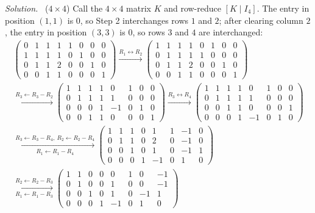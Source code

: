 \documentclass[12pt]{article}
\theoremstyle{definition}
\newenvironment{solution}{\par\noindent\textit{Solution.}\ }{\par\smallskip}
\begin{document}
\begin{solution}
(\(4\times4\)) Call the \(4\times4\) matrix \(K\) and row-reduce \([K\mid I_4]\). The entry in
position \((1,1)\) is \(0\), so Step 2 interchanges rows \(1\) and \(2\); after clearing column
\(2\), the entry in position \((3,3)\) is \(0\), so rows \(3\) and \(4\) are interchanged:
\[
\begin{gathered}
\left(\begin{array}{cccc|cccc}0&1&1&1&1&0&0&0\\1&1&1&1&0&1&0&0\\0&1&1&2&0&0&1&0\\0&0&1&1&0&0&0&1\end{array}\right)
\xrightarrow{R_1\leftrightarrow R_2}
\left(\begin{array}{cccc|cccc}1&1&1&1&0&1&0&0\\0&1&1&1&1&0&0&0\\0&1&1&2&0&0&1&0\\0&0&1&1&0&0&0&1\end{array}\right)
\\
\xrightarrow{R_3\leftarrow R_3-R_2}
\left(\begin{array}{cccc|cccc}1&1&1&1&0&1&0&0\\0&1&1&1&1&0&0&0\\0&0&0&1&-1&0&1&0\\0&0&1&1&0&0&0&1\end{array}\right)
\xrightarrow{R_3\leftrightarrow R_4}
\left(\begin{array}{cccc|cccc}1&1&1&1&0&1&0&0\\0&1&1&1&1&0&0&0\\0&0&1&1&0&0&0&1\\0&0&0&1&-1&0&1&0\end{array}\right)
\\
\xrightarrow[R_1\leftarrow R_1-R_4]{R_3\leftarrow R_3-R_4,\ R_2\leftarrow R_2-R_4}
\left(\begin{array}{cccc|cccc}1&1&1&0&1&1&-1&0\\0&1&1&0&2&0&-1&0\\0&0&1&0&1&0&-1&1\\0&0&0&1&-1&0&1&0\end{array}\right)
\\
\xrightarrow[R_1\leftarrow R_1-R_3]{R_2\leftarrow R_2-R_3}
\left(\begin{array}{cccc|cccc}1&1&0&0&0&1&0&-1\\0&1&0&0&1&0&0&-1\\0&0&1&0&1&0&-1&1\\0&0&0&1&-1&0&1&0\end{array}\right)

\end{gathered}\]
\end{solution}
\end{document}
